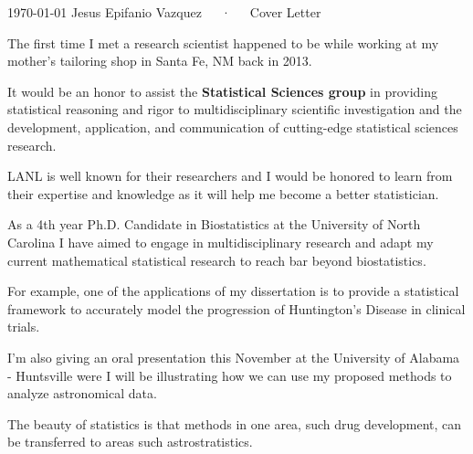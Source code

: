\documentclass[11pt, a4paper]{awesome-cv}
\begin{document}
\makecvheader[R]

\makecvfooter
  {\today}
  {Jesus Epifanio Vazquez~~~·~~~Cover Letter}

\makelettertitle

\begin{cvletter}


The first time I met a research scientist happened to be while working at my mother's tailoring shop in Santa Fe, NM back in 2013.



It would be an honor to assist the {\bf Statistical Sciences group} in  providing statistical reasoning and rigor to multidisciplinary scientific investigation and the development, application, and communication of cutting-edge statistical sciences research. 

LANL is well known for their researchers and I would be honored to learn from their expertise and knowledge as it will help me become a better statistician. 
 

As a 4th year Ph.D. Candidate in Biostatistics at the University of North Carolina I have aimed to engage in multidisciplinary research and adapt my current mathematical statistical research to reach bar beyond biostatistics. 

For example, one of the applications of my dissertation is to provide a statistical framework to accurately model the progression of Huntington's Disease in clinical trials. 

I'm also giving an oral presentation this November at the University of Alabama - Huntsville were I will be illustrating how we can use my proposed methods to analyze astronomical data.

The beauty of statistics is that methods in one area, such drug development, can be transferred to areas such astrostratistics.


\end{cvletter}
\end{document}
